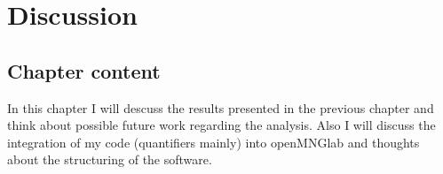 \chapter{Discussion}

\section{Chapter content}
In this chapter I will descuss the results presented in the previous chapter and think about possible future work regarding the analysis. Also I will discuss the integration of my code (quantifiers mainly) into openMNGlab and thoughts about the structuring of the software.




\cleardoublepage
